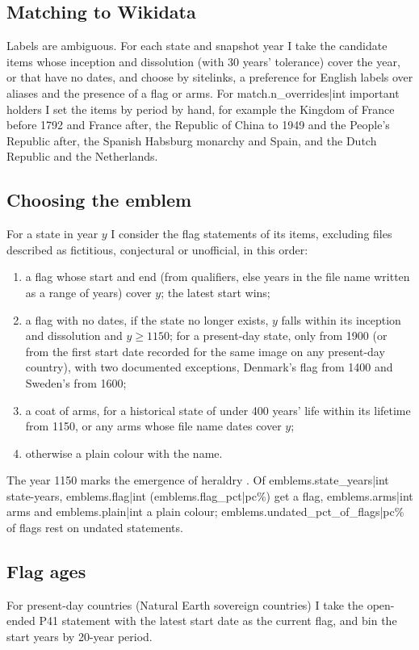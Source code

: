 \documentclass[11pt,a4paper]{article}
\begin{document}
\subsection{Matching to Wikidata}
Labels are ambiguous. For each state and snapshot year I take the candidate items whose inception and dissolution (with 30 years' tolerance) cover the year, or that have no dates, and choose by sitelinks, a preference for English labels over aliases and the presence of a flag or arms. For {{match.n_overrides|int}} important holders I set the items by period by hand, for example the Kingdom of France before 1792 and France after, the Republic of China to 1949 and the People's Republic after, the Spanish Habsburg monarchy and Spain, and the Dutch Republic and the Netherlands.

\subsection{Choosing the emblem}
For a state in year $y$ I consider the flag statements of its items, excluding files described as fictitious, conjectural or unofficial, in this order:
\begin{enumerate}
\item a flag whose start and end (from qualifiers, else years in the file name written as a range of years) cover $y$; the latest start wins;
\item a flag with no dates, if the state no longer exists, $y$ falls within its inception and dissolution and $y \ge 1150$; for a present-day state, only from 1900 (or from the first start date recorded for the same image on any present-day country), with two documented exceptions, Denmark's flag from 1400 and Sweden's from 1600;
\item a coat of arms, for a historical state of under 400 years' life within its lifetime from 1150, or any arms whose file name dates cover $y$;
\item otherwise a plain colour with the name.
\end{enumerate}
The year 1150 marks the emergence of heraldry \citep{pastoureau}. Of {{emblems.state_years|int}} state-years, {{emblems.flag|int}} ({{emblems.flag_pct|pc}}\%) get a flag, {{emblems.arms|int}} arms and {{emblems.plain|int}} a plain colour; {{emblems.undated_pct_of_flags|pc}}\% of flags rest on undated statements.

\subsection{Flag ages}
For present-day countries (Natural Earth sovereign countries) I take the open-ended P41 statement with the latest start date as the current flag, and bin the start years by 20-year period.
\end{document}
